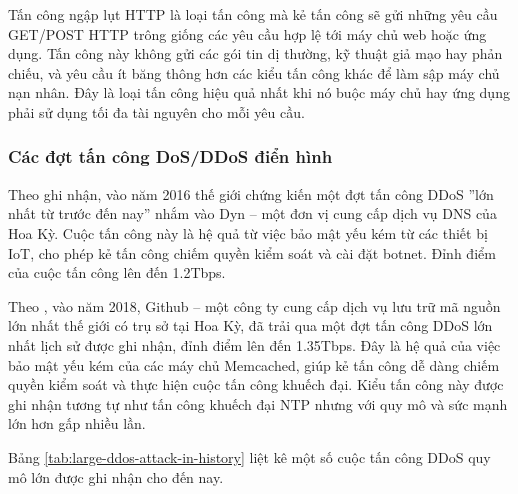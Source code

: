 Tấn công ngập lụt HTTP \cite{2-imperva} là loại tấn công mà kẻ tấn công sẽ gửi những yêu cầu GET/POST HTTP trông giống các yêu cầu hợp lệ tới máy chủ web hoặc ứng dụng. Tấn công này không gửi các gói tin dị thường, kỹ thuật giả mạo hay phản chiếu, và yêu cầu ít băng thông hơn các kiểu tấn công khác để làm sập máy chủ nạn nhân. Đây là loại tấn công hiệu quả nhất khi nó buộc máy chủ hay ứng dụng phải sử dụng tối đa tài nguyên cho mỗi yêu cầu.

\subsubsection{Các đợt tấn công DoS/DDoS điển hình}

Theo \cite{6-wired} ghi nhận, vào năm 2016 thế giới chứng kiến một đợt tấn công DDoS ''lớn nhất từ trước đến nay'' nhắm vào Dyn – một đơn vị cung cấp dịch vụ DNS của Hoa Kỳ. Cuộc tấn công này là hệ quả từ việc bảo mật yếu kém từ các thiết bị IoT, cho phép kẻ tấn công chiếm quyền kiểm soát và cài đặt botnet. Đỉnh điểm của cuộc tấn công lên đến 1.2Tbps.

Theo \cite{7-wired}, vào năm 2018, Github – một công ty cung cấp dịch vụ lưu trữ mã nguồn lớn nhất thế giới có trụ sở tại Hoa Kỳ, đã trải qua một đợt tấn công DDoS lớn nhất lịch sử được ghi nhận, đỉnh điểm lên đến 1.35Tbps. Đây là hệ quả của việc bảo mật yếu kém của các máy chủ Memcached, giúp kẻ tấn công dễ dàng chiếm quyền kiểm soát và thực hiện cuộc tấn công khuếch đại. Kiểu tấn công này được ghi nhận tương tự như tấn công khuếch đại NTP nhưng với quy mô và sức mạnh lớn hơn gấp nhiều lần.

Bảng \ref{tab:large-ddos-attack-in-history} liệt kê một số cuộc tấn công DDoS quy mô lớn được ghi nhận cho đến nay.

